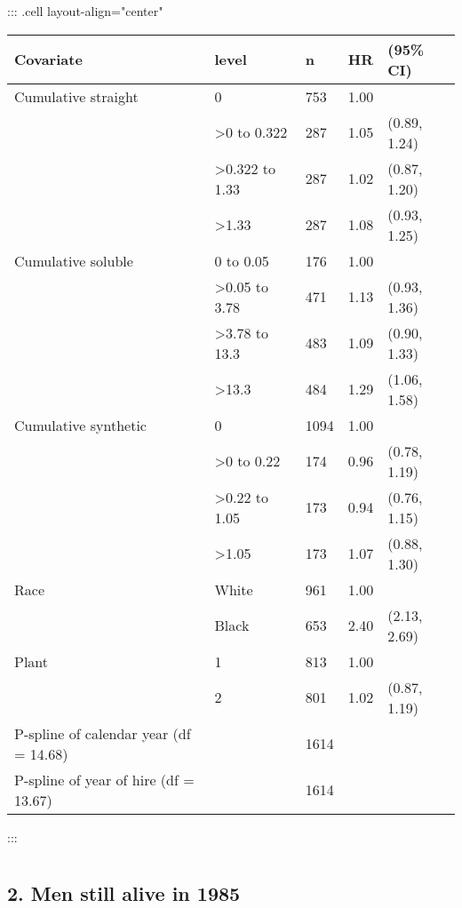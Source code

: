\documentclass[
  11pt,
  letterpaper,
  DIV=11,
  numbers=noendperiod]{scrartcl}
\theoremstyle{remark}\newtheorem*{claim}{Claim}
\begin{document}
\begin{table}[H]
\centering
::: {.cell layout-align="center"}
\begin{tabular}{lllll}
  \toprule
Covariate & level & n & HR & (95\% CI) \\ 
  \midrule
Cumulative straight & 0 & 753 & 1.00 &  \\ 
   & >0 to 0.322 & 287 & 1.05 & (0.89, 1.24) \\ 
   & >0.322 to 1.33 & 287 & 1.02 & (0.87, 1.20) \\ 
   & >1.33 & 287 & 1.08 & (0.93, 1.25) \\ 
  Cumulative soluble & 0 to 0.05 & 176 & 1.00 &  \\ 
   & >0.05 to 3.78 & 471 & 1.13 & (0.93, 1.36) \\ 
   & >3.78 to 13.3 & 483 & 1.09 & (0.90, 1.33) \\ 
   & >13.3 & 484 & 1.29 & (1.06, 1.58) \\ 
  Cumulative synthetic & 0 & 1094 & 1.00 &  \\ 
   & >0 to 0.22 & 174 & 0.96 & (0.78, 1.19) \\ 
   & >0.22 to 1.05 & 173 & 0.94 & (0.76, 1.15) \\ 
   & >1.05 & 173 & 1.07 & (0.88, 1.30) \\ 
  Race & White & 961 & 1.00 &  \\ 
   & Black & 653 & 2.40 & (2.13, 2.69) \\ 
  Plant & 1 & 813 & 1.00 &  \\ 
   & 2 & 801 & 1.02 & (0.87, 1.19) \\ 
  P-spline of calendar year (df = 14.68) &  & 1614 &  &  \\ 
  P-spline of year of hire (df = 13.67) &  & 1614 &  &  \\ 
   \bottomrule
\end{tabular}
:::
\end{table}

\hypertarget{section-4}{%
\section{}\label{section-4}}

\hypertarget{men-still-alive-in-1985}{%
\subsection{2. Men still alive in 1985}\label{men-still-alive-in-1985}}
\end{document}
